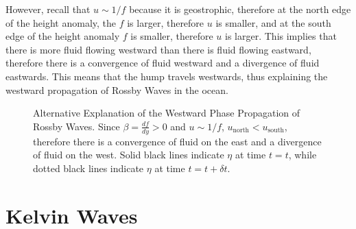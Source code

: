 However, recall that $u\sim 1/f$ because it is geostrophic, therefore at the north edge of the height anomaly, the $f$ is larger, therefore $u$ is smaller, and at the south edge of the height anomaly $f$ is smaller, therefore $u$ is larger. This implies that there is more fluid flowing westward than there is fluid flowing eastward, therefore there is a convergence of fluid westward and a divergence of fluid eastwards. This means that the hump travels westwards, thus explaining the westward propagation of Rossby Waves in the ocean.

\begin{figure}[H]
    \centering
    \caption{Alternative Explanation of the Westward Phase Propagation of Rossby Waves. Since $\beta=\frac{df}{dy}>0$ and $u\sim 1/f$, $u_{\text{north}}<u_\text{south}$, therefore there is a convergence of fluid on the east and a divergence of fluid on the west. Solid black lines indicate $\eta$ at time $t=t$, while dotted black lines indicate $\eta$ at time $t=t+\delta t$.}
\end{figure}

\section{Kelvin Waves}

